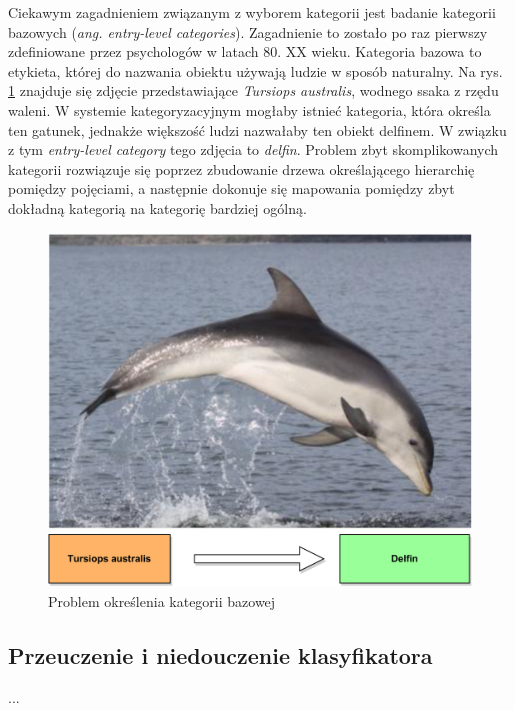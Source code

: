 Ciekawym zagadnieniem związanym z wyborem kategorii jest badanie kategorii bazowych (\emph{ang. entry-level categories}).\cite{ORDONEZ13} Zagadnienie to zostało po raz pierwszy zdefiniowane przez psychologów w latach 80. XX wieku. Kategoria bazowa to etykieta, której do nazwania obiektu używają ludzie w sposób naturalny. Na rys. \ref{fig:dolphin} znajduje się zdjęcie przedstawiające \emph{Tursiops australis}, wodnego ssaka z rzędu waleni. W systemie kategoryzacyjnym mogłaby istnieć kategoria, która określa ten gatunek, jednakże większość ludzi nazwałaby ten obiekt delfinem. W związku z tym \emph{entry-level category} tego zdjęcia to \emph{delfin}. Problem zbyt skomplikowanych kategorii rozwiązuje się poprzez zbudowanie drzewa określającego hierarchię pomiędzy pojęciami, a następnie dokonuje się mapowania pomiędzy zbyt dokładną kategorią na kategorię bardziej ogólną.

\begin{figure}[h]
	\centering
	\includegraphics[scale=0.3]{graphics/01_podstawy_teoretyczne/dolphin.pdf}
	\caption{ Problem określenia kategorii bazowej \cite{CHARLTON11} }
	\label{fig:dolphin}
\end{figure}

\subsection{Przeuczenie i niedouczenie klasyfikatora}
...